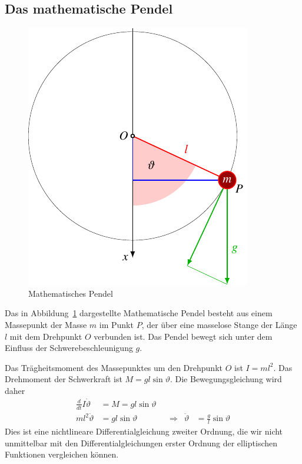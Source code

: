 %
%
%

\subsection{Das mathematische Pendel
\label{buch:elliptisch:subsection:mathpendel}}
\begin{figure}
\centering
\includegraphics{chapters/110-elliptisch/images/pendel.pdf}
\caption{Mathematisches Pendel
\label{buch:elliptisch:fig:mathpendel}}
\end{figure}
Das in Abbildung~\ref{buch:elliptisch:fig:mathpendel} dargestellte
Mathematische Pendel besteht aus einem Massepunkt der Masse $m$
im Punkt $P$,
der über eine masselose Stange der Länge $l$ mit dem Drehpunkt $O$
verbunden ist.
Das Pendel bewegt sich unter dem Einfluss der Schwerebeschleunigung $g$.

Das Trägheitsmoment des Massepunktes um den Drehpunkt $O$ ist
\(
I=ml^2
\).
Das Drehmoment der Schwerkraft ist
\(M=gl\sin\vartheta\).
Die Bewegungsgleichung wird daher
\[
\begin{aligned}
\frac{d}{dt} I\dot{\vartheta}
&=
M
=
gl\sin\vartheta
\\
ml^2\ddot{\vartheta}
&=
gl\sin\vartheta
&&\Rightarrow&
\ddot{\vartheta}
&=\frac{g}{l}\sin\vartheta
\end{aligned}
\]
Dies ist eine nichtlineare Differentialgleichung zweiter Ordnung, die
wir nicht unmittelbar mit den Differentialgleichungen erster Ordnung
der elliptischen Funktionen vergleichen können.

